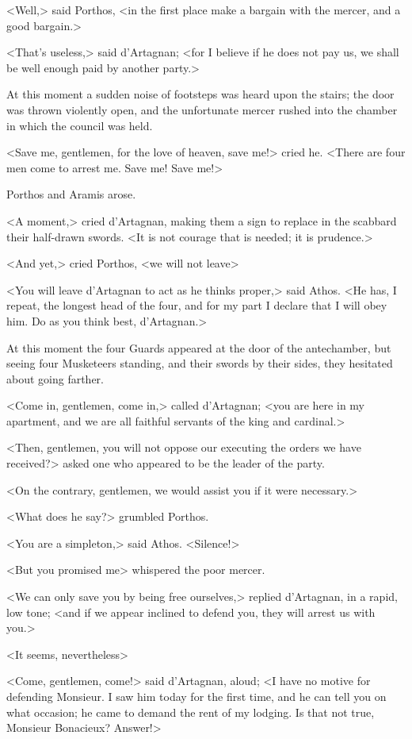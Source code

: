 <Well,> said Porthos, <in the first place make a bargain with the mercer, and a good bargain.> 

<That's useless,> said d'Artagnan; <for I believe if he does not pay us, we shall be well enough paid by another party.> 

At this moment a sudden noise of footsteps was heard upon the stairs; the door was thrown violently open, and the unfortunate mercer rushed into the chamber in which the council was held. 

<Save me, gentlemen, for the love of heaven, save me!> cried he. <There are four men come to arrest me. Save me! Save me!> 

Porthos and Aramis arose. 

<A moment,> cried d'Artagnan, making them a sign to replace in the scabbard their half-drawn swords. <It is not courage that is needed; it is prudence.> 

<And yet,> cried Porthos, <we will not leave\longdash> 

<You will leave d'Artagnan to act as he thinks proper,> said Athos. <He has, I repeat, the longest head of the four, and for my part I declare that I will obey him. Do as you think best, d'Artagnan.> 

At this moment the four Guards appeared at the door of the antechamber, but seeing four Musketeers standing, and their swords by their sides, they hesitated about going farther. 

<Come in, gentlemen, come in,> called d'Artagnan; <you are here in my apartment, and we are all faithful servants of the king and cardinal.> 

<Then, gentlemen, you will not oppose our executing the orders we have received?> asked one who appeared to be the leader of the party. 

<On the contrary, gentlemen, we would assist you if it were necessary.> 

<What does he say?> grumbled Porthos. 

<You are a simpleton,> said Athos. <Silence!> 

<But you promised me\longdash> whispered the poor mercer. 

<We can only save you by being free ourselves,> replied d'Artagnan, in a rapid, low tone; <and if we appear inclined to defend you, they will arrest us with you.> 

<It seems, nevertheless\longdash> 

<Come, gentlemen, come!> said d'Artagnan, aloud; <I have no motive for defending Monsieur. I saw him today for the first time, and he can tell you on what occasion; he came to demand the rent of my lodging. Is that not true, Monsieur Bonacieux? Answer!> 

